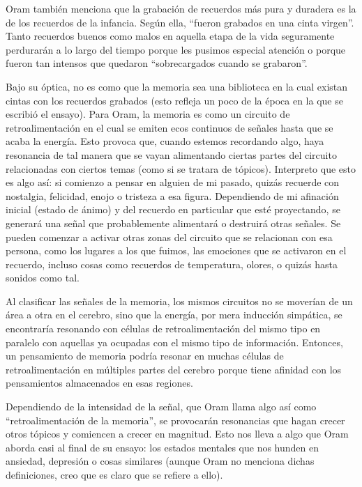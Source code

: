 Oram también menciona que la grabación de recuerdos más pura y duradera es la de los recuerdos de la infancia.
Según ella, ``fueron grabados en una cinta virgen''. Tanto recuerdos buenos como malos en aquella etapa de la vida
seguramente perdurarán a lo largo del tiempo porque les pusimos especial atención o porque fueron tan intensos que
quedaron ``sobrecargados cuando se grabaron''. 

Bajo su óptica, no es como que la memoria sea una biblioteca en la cual existan cintas con los recuerdos grabados (esto
refleja un poco de la época en la que se escribió el ensayo). Para Oram, la memoria es como un circuito de retroalimentación
en el cual se emiten ecos continuos de señales hasta que se acaba la energía. Esto provoca que, cuando estemos recordando algo,
haya resonancia de tal manera que se vayan alimentando ciertas partes del circuito relacionadas con ciertos temas
(como si se tratara de tópicos). Interpreto que esto es algo así: si comienzo a pensar en alguien de mi pasado, quizás
recuerde con nostalgia, felicidad, enojo o tristeza a esa figura. Dependiendo de mi afinación inicial (estado de ánimo) y
del recuerdo en particular que esté proyectando, se generará una señal que probablemente alimentará o destruirá otras
señales. Se pueden comenzar a activar otras zonas del circuito que se relacionan con esa persona, como los lugares 
a los que fuimos, las emociones que se activaron en el recuerdo, incluso cosas como recuerdos de temperatura, olores,
o quizás hasta sonidos como tal.

\begin{quoting}
    Al clasificar las señales de la memoria, los mismos circuitos no se moverían de un área a otra en el cerebro, sino 
    que la energía, por mera inducción simpática, se encontraría resonando con células de retroalimentación del mismo tipo 
    en paralelo con aquellas ya ocupadas con el mismo tipo de información. Entonces, un pensamiento de memoria podría 
    resonar en muchas células de retroalimentación en múltiples partes del cerebro porque tiene afinidad con los pensamientos
    almacenados en esas regiones.
\end{quoting}

Dependiendo de la intensidad de la señal, que Oram llama algo así como ``retroalimentación de la memoria'', se 
provocarán resonancias que hagan crecer otros tópicos y comiencen a crecer en magnitud. Esto nos lleva a algo que Oram
aborda casi al final de su ensayo: los estados mentales que nos hunden en ansiedad, depresión o cosas similares (aunque
Oram no menciona dichas definiciones, creo que es claro que se refiere a ello). 

